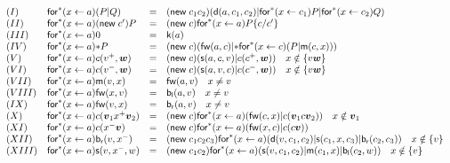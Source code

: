 \documentclass{llncs}
\newcommand{\pzero}{\mathbin{0}}
\newcommand{\substn}[2]{\{ #1 / #2 \}}
\begin{document}
\[\begin{array}{llrl}
(I)&\mathsf{for}^*(x \leftarrow a)(P|Q) &=& (\mathsf{new}\; c_1c_2)(\mathsf{d}(a,c_1,c_2) | \mathsf{for}^*(x \leftarrow c_1)P | \mathsf{for}^*(x \leftarrow c_2)Q)\\
(II)&\mathsf{for}^*(x \leftarrow a)(\mathsf{new}\; c')P &=& (\mathsf{new}\; c)\mathsf{for}^*(x \leftarrow a)P\substn{c}{c'} \\
(III)& \mathsf{for}^*(x \leftarrow a)\pzero &=& \mathsf{k}(a) \\
(IV)&\mathsf{for}^*(x \leftarrow a)\mathsf{*}P &=& (\mathsf{new}\;c)(\mathsf{fw}(a,c) | \mathsf{*}\mathsf{for}^*(x \leftarrow c)(P | \mathsf{m}(c,x)))\\
(V)&\mathsf{for}^*(x \leftarrow a)c(v^+,\vec{w}) &=& (\mathsf{new}\;c)(\mathsf{s}(a,c,v) | c(c^+,\vec{w})) \mbox{\quad $x \notin \{v\vec{w}\}$}\\
(VI)&\mathsf{for}^*(x \leftarrow a)c(v^-,\vec{w})&=& (\mathsf{new}\;c)(\mathsf{s}(a,v,c) | c(c^-,\vec{w})) \mbox{\quad $x \notin \{v\vec{w}\}$}\\
(VII)&\mathsf{for}^*(x \leftarrow a)\mathsf{m}(v,x)&=& \mathsf{fw}(a,v) \mbox{\quad $x \neq v$}\\
(VIII)&\mathsf{for}^*(x \leftarrow a)\mathsf{fw}(x,v)&=& \mathsf{b}_{\mathsf{l}}(a,v) \mbox{\quad $x \neq v$}\\
(IX)&\mathsf{for}^*(x \leftarrow a)\mathsf{fw}(v,x)&=& \mathsf{b}_{\mathsf{r}}(a,v) \mbox{\quad $x \neq v$}\\
(X)&\mathsf{for}^*(x \leftarrow a)c(\vec{v}_1x^+\vec{v}_2)&=&(\mathsf{new}\; c)\mathsf{for}^*(x \leftarrow a)(\mathsf{fw}(c,x) | c(\vec{v}_1c\vec{v}_2)) \mbox{\quad $x \notin \vec{v}_1$}\\
(XI)&\mathsf{for}^*(x \leftarrow a)c(x^-\vec{v})&=& (\mathsf{new}\; c)\mathsf{for}^*(x \leftarrow a)(\mathsf{fw}(x,c) | c(c\vec{v}))\\
(XII)&\mathsf{for}^*(x \leftarrow a)\mathsf{b}_{\mathsf{r}}(v,x^-)&=& (\mathsf{new}\; c_1c_2c_3)\mathsf{for}^*(x \leftarrow a)(\mathsf{d}(v,c_1,c_2)|\mathsf{s}(c_1,x,c_3)|\mathsf{b}_{\mathsf{r}}(c_2,c_3)) \mbox{\quad $x \notin \{v \}$}\\
(XIII)&\mathsf{for}^*(x \leftarrow a)\mathsf{s}(v,x^-,w) &=& (\mathsf{new}\; c_1c_2)\mathsf{for}^*(x \leftarrow a)(\mathsf{s}(v,c_1,c_2) | \mathsf{m}(c_1,x) | \mathsf{b}_{\mathsf{l}}(c_2,w)) \mbox{\quad $x \notin \{v \}$}
\end{array}\]
\end{document}
